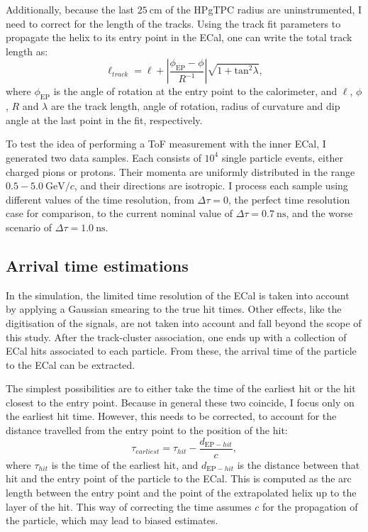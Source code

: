 Additionally, because the last $25~\mathrm{cm}$ of the HPgTPC radius are uninstrumented, I need to correct for the length of the tracks. Using the track fit parameters to propagate the helix to its entry point in the ECal, one can write the total track length as:
\begin{equation}
	\ell_{track} = \ell + \left| \frac{\phi_{\mathrm{EP}} - \phi}{R^{-1}} \right| \sqrt{1+\mathrm{tan}^{2}\lambda},
\end{equation}
where $\phi_{\mathrm{EP}}$ is the angle of rotation at the entry point to the calorimeter, and $\ell$, $\phi$, $R$ and $\lambda$ are the track length, angle of rotation, radius of curvature and dip angle at the last point in the fit, respectively.

To test the idea of performing a ToF measurement with the inner ECal, I generated two data samples. Each consists of $10^{4}$ single particle events, either charged pions or protons. Their momenta are uniformly distributed in the range $0.5-5.0~\mathrm{GeV}/c$, and their directions are isotropic. I process each sample using different values of the time resolution, from $\Delta \tau = 0$, the perfect time resolution case for comparison, to the current nominal value of $\Delta \tau = 0.7~\mathrm{ns}$, and the worse scenario of $\Delta \tau = 1.0~\mathrm{ns}$.

\subsection{Arrival time estimations}

In the simulation, the limited time resolution of the ECal is taken into account by applying a Gaussian smearing to the true hit times. Other effects, like the digitisation of the signals, are not taken into account and fall beyond the scope of this study. After the track-cluster association, one ends up with a collection of ECal hits associated to each particle. From these, the arrival time of the particle to the ECal can be extracted.

The simplest possibilities are to either take the time of the earliest hit or the hit closest to the entry point. Because in general these two coincide, I focus only on the earliest hit time. However, this needs to be corrected, to account for the distance travelled from the entry point to the position of the hit:
\begin{equation}\label{8.22}
	\tau_{earliest} = \tau_{hit} - \frac{d_{\mathrm{EP}-hit}}{c},
\end{equation}
where $\tau_{hit}$ is the time of the earliest hit, and $d_{\mathrm{EP}-hit}$ is the distance between that hit and the entry point of the particle to the ECal. This is computed as the arc length between the entry point and the point of the extrapolated helix up to the layer of the hit. This way of correcting the time assumes $c$ for the propagation of the particle, which may lead to biased estimates.

